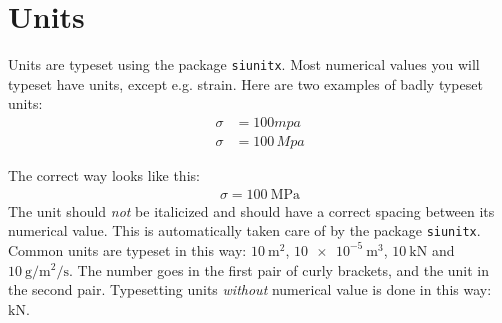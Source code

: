 \chapter{Units}
Units are typeset using the package \texttt{siunitx}. Most numerical values you will typeset have units, except e.g. strain. Here are two examples of badly typeset units: 
\begin{align*}
\sigma &= 100 mpa \\
\sigma &= 100\, Mpa
\end{align*}

The correct way looks like this:
\begin{align*}
\sigma = \SI{100}{\mega\pascal}
\end{align*}
The unit should \emph{not} be italicized and should have a correct spacing between its numerical value. This is automatically taken care of by the package \texttt{siunitx}. Common units are typeset in this way: $\SI{10}{\meter\squared}$, $\SI{10e-5}{\meter\cubed}$, $\SI{10}{\kilo\newton}$ and $\SI{10}{\gram\per\meter\squared\per\second}$. The number goes in the first pair of curly brackets, and the unit in the second pair. Typesetting units \emph{without} numerical value is done in this way: $\si{\kilo\newton}$.